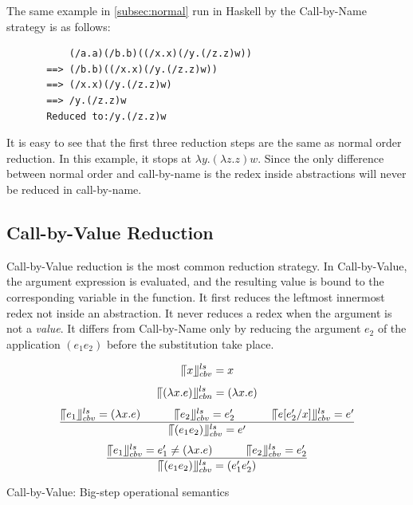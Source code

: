 \begin{exmp}
\normalfont The same example in \ref{subsec:normal} run in Haskell by the Call-by-Name strategy is as follows:
\end{exmp}


\begin{verbatim}
           (/a.a)(/b.b)((/x.x)(/y.(/z.z)w))
       ==> (/b.b)((/x.x)(/y.(/z.z)w))
       ==> (/x.x)(/y.(/z.z)w)
       ==> /y.(/z.z)w
       Reduced to:/y.(/z.z)w
\end{verbatim}

It is easy to see that the first three reduction steps are the same as normal order reduction. In this example, it stops at $\lambda y.(\lambda z.z)w$. Since the only difference between normal order and call-by-name is the redex inside abstractions will never be reduced in call-by-name. 


\subsection{Call-by-Value Reduction}{\label{subsec:cbv}}

Call-by-Value reduction is the most common reduction strategy. In Call-by-Value, the argument expression is evaluated, and the resulting value is bound to the corresponding variable in the function. It first reduces the leftmost innermost redex not inside an abstraction. It never reduces a redex when the argument is not a \textit{value}. It differs from Call-by-Name only by reducing the argument $e_2$ of the application $(e_1e_2)$ before the substitution take place. 


\begin{equation*}
\llceil x \rrfloor ^{ls} _{cbv} = x
\end{equation*}
\begin{equation*}
\llceil (\lambda x.e) \rrfloor ^{ls} _{cbn} = (\lambda x.e)
\end{equation*}
\begin{equation*}
\frac{\llceil e_1 \rrfloor ^{ls} _{cbv} = (\lambda x.e)\ \ \ \ \ \ \ \ \ \llceil e_2 \rrfloor ^{ls} _{cbv} = e'_2\ \ \ \ \ \ \ \ \ \ \llceil e[e'_2/x] \rrfloor ^{ls} _{cbv}  = e'}{\llceil (e_1e_2) \rrfloor ^{ls} _{cbv} = e'}
\end{equation*}
\begin{equation*}
\frac{\llceil e_1 \rrfloor ^{ls} _{cbv} = e'_1\neq (\lambda x.e)\ \ \ \ \ \ \ \ \ \llceil e_2 \rrfloor ^{ls} _{cbv} = e'_2}{\llceil (e_1e_2) \rrfloor ^{ls} _{cbv} = (e'_1e'_2)}
\end{equation*}
\begin{center}
Call-by-Value: Big-step operational semantics
\end{center}

